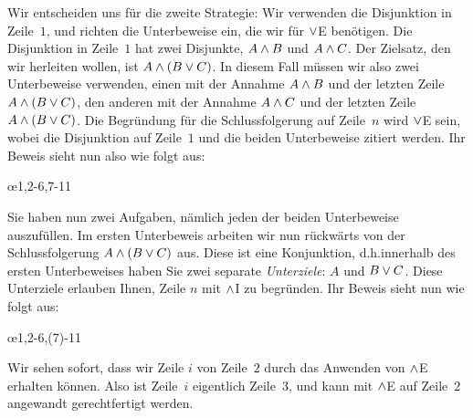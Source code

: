 Wir entscheiden uns für die zweite Strategie: Wir verwenden die Disjunktion in Zeile~$1$, und richten die Unterbeweise ein, die wir für $\vee$E benötigen. Die Disjunktion in Zeile~$1$ hat zwei Disjunkte, $A \wedge B$ und $A \wedge C$. Der Zielsatz, den wir herleiten wollen, ist $A \wedge (B \vee C)$. In diesem Fall müssen wir also zwei Unterbeweise verwenden, einen mit der Annahme $A \wedge B$ und der letzten Zeile $A \wedge (B \vee C)$, den anderen mit der Annahme $A \wedge C$ und der letzten Zeile $A \wedge (B \vee C)$. Die Begründung für die Schlussfolgerung auf Zeile~$n$ wird $\vee$E sein, wobei die Disjunktion auf Zeile~$1$ und die beiden Unterbeweise zitiert werden. Ihr Beweis sieht nun also wie folgt aus:
\begin{fitchproof}
	\open
	\ellipsesline 
	\close
	\open
	\ellipsesline
	\close
	\oe{1,2-6,7-11}
\end{fitchproof}
Sie haben nun zwei Aufgaben, nämlich jeden der beiden Unterbeweise auszufüllen. Im ersten Unterbeweis arbeiten wir nun rückwärts von der Schlussfolgerung $A \wedge (B \vee C)$ aus. Diese ist eine Konjunktion, d.h.\@ innerhalb des ersten Unterbeweises haben Sie zwei separate \emph{Unterziele}: $A$ und $B \vee C$. Diese Unterziele erlauben Ihnen, Zeile $n$ mit $\wedge$I zu begründen. Ihr Beweis sieht nun wie folgt aus:
\begin{fitchproof}
	\open
	\ellipsesline
	\ellipsesline
	\close
	\open
	\ellipsesline
	\close
	\oe{1,2-6,(7)-11}
\end{fitchproof}
Wir sehen sofort, dass wir Zeile $i$ von Zeile~$2$ durch das Anwenden von $\wedge$E erhalten können. Also ist Zeile~$i$ eigentlich Zeile~$3$, und kann mit $\wedge$E auf Zeile~$2$ angewandt gerechtfertigt werden. 


